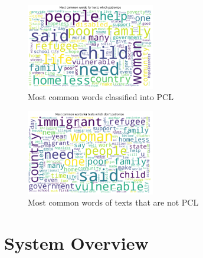 \documentclass[11pt]{article}
\begin{document}
\begin{figure}[h]
\centering
\includegraphics[width=0.5\textwidth]{pcl.png}
\caption{Most common words classified into PCL}
\label{fig3}
\end{figure}

\begin{figure}[h]
\centering
\includegraphics[width=0.5\textwidth]{nopcl.png}
\caption{Most common words of texts that are not PCL}
\label{fig4}
\end{figure}

\section{System Overview}
\end{document}
